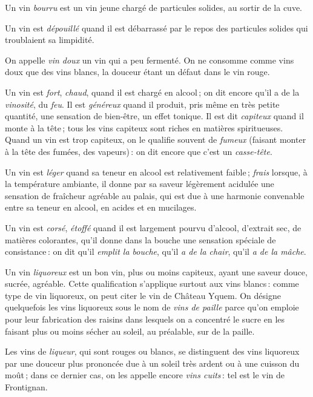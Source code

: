 Un vin \textit{bourru} est un vin jeune chargé de particules solides, au sortir
de la cuve.

Un vin est \textit{dépouillé} quand il est débarrassé par le repos des
particules solides qui troublaient sa limpidité.

On appelle \textit{vin doux} un vin qui a peu fermenté. On ne consomme comme
vins doux que des vins blancs, la douceur étant un défaut dans le vin rouge.

Un vin est \textit{fort}, \textit{chaud}, quand il est chargé en alcool ; on
dit encore qu'il a de la \textit{vinosité}, du \textit{feu}. Il est
\textit{généreux} quand il produit, pris même en très petite quantité, une
sensation de bien-être, un effet tonique. Il est dit \textit{capiteux} quand il
monte à la tête ; tous les vins capiteux sont riches en matières spiritueuses.
Quand un vin est trop capiteux, on le qualifie souvent de \textit{fumeux}
(faisant monter à la tête des fumées, des vapeurs) : on dit encore que c'est un
\textit{casse-tête}.

Un vin est \textit{léger} quand sa teneur en alcool est relativement faible ;
\textit{frais} lorsque, à la température ambiante, il donne par sa saveur
légèrement acidulée une sensation de fraîcheur agréable au palais, qui est due
à une harmonie convenable entre sa teneur en alcool, en acides et en mucilages.

Un vin est \textit{corsé}, \textit{étoffé} quand il est largement pourvu
d'alcool, d'extrait sec, de matières colorantes, qu'il donne dans la bouche une
sensation spéciale de consistance : on dit qu'il \textit{emplit la bouche},
qu'il \textit{a de la chair}, qu'il \textit{a de la mâche}.

Un vin \textit{liquoreux} est un bon vin, plus ou moins capiteux, ayant une
saveur douce, sucrée, agréable. Cette qualification s'applique surtout aux vins
blancs : comme type de vin liquoreux, on peut citer le vin de Château Yquem. On
désigne quelquefois les vins liquoreux sous le nom de \textit{vins de paille}
parce qu'on emploie pour leur fabrication des raisins dans lesquels on
a concentré le sucre en les faisant plus ou moins sécher au soleil, au
préalable, sur de la paille.

Les vins de \textit{liqueur}, qui sont rouges ou blancs, se distinguent des
vins liquoreux par une douceur plus prononcée due à un soleil très ardent ou
à une cuisson du moût ; dans ce dernier cas, on les appelle encore \textit{vins
cuits} : tel est le vin de Frontignan.

